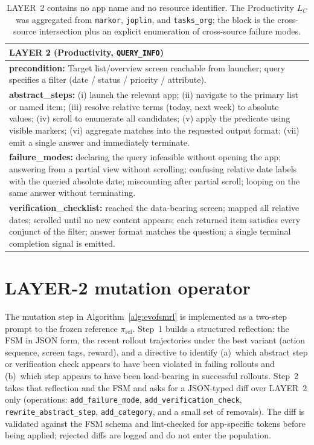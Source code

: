 \begin{table}[t]
\small
\begin{tabular}{p{}}
\hline
\textbf{LAYER 2 (Productivity, \texttt{QUERY\_INFO})} \\
\hline
\textbf{precondition:} Target list/overview screen reachable from launcher; query
specifies a filter (date / status / priority / attribute). \\
\textbf{abstract\_steps:} (i) launch the relevant app; (ii) navigate to the
primary list or named item; (iii) resolve relative terms (today, next week) to
absolute values; (iv) scroll to enumerate all candidates; (v) apply the predicate
using visible markers; (vi) aggregate matches into the requested output format;
(vii) emit a single answer and immediately terminate. \\
\textbf{failure\_modes:} declaring the query infeasible without opening the app;
answering from a partial view without scrolling; confusing relative date labels
with the queried absolute date; miscounting after partial scroll; looping on the
same answer without terminating. \\
\textbf{verification\_checklist:} reached the data-bearing screen; mapped all
relative dates; scrolled until no new content appears; each returned item
satisfies every conjunct of the filter; answer format matches the question; a
single terminal completion signal is emitted. \\
\hline
\end{tabular}
\caption{LAYER~2 contains no app name and no resource identifier. The Productivity
$L_C$ was aggregated from \texttt{markor}, \texttt{joplin}, and
\texttt{tasks\_org}; the block is the cross-source intersection plus an explicit
enumeration of cross-source failure modes.}
\label{fig:layer2}
\end{table}

\section{LAYER-2 mutation operator}
\label{app:mutation}

The mutation step in Algorithm~\ref{alg:evofsmrl} is implemented as a two-step
prompt to the frozen reference $\pi_{\text{ref}}$. Step~1 builds a structured
reflection: the FSM in JSON form, the recent rollout trajectories under the best
variant (action sequence, screen tags, reward), and a directive to identify
(a)~which abstract step or verification check appears to have been violated in
failing rollouts and (b)~which step appears to have been load-bearing in
successful rollouts. Step~2 takes that reflection and the FSM and asks for a
JSON-typed diff over LAYER~2 only (operations: \texttt{add\_failure\_mode},
\texttt{add\_verification\_check}, \texttt{rewrite\_abstract\_step},
\texttt{add\_category}, and a small set of removals). The diff is validated
against the FSM schema and lint-checked for app-specific tokens before being
applied; rejected diffs are logged and do not enter the population.
